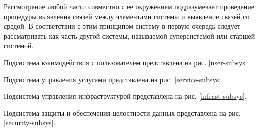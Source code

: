 Рассмотрение любой части совместно с ее окружением подразумевает проведение процедуры выявления связей между элементами системы и выявление связей со средой.
В соответствии с этим принципом систему в первую очередь следует рассматривать как часть другой системы, называемой суперсистемой или старшей системой.

Подсистема взаимодействия с пользователем представлена на рис. \ref{user-subsys}.

Подсистема управления услугами представлена на рис. \ref{service-subsys}.

Подсистема управления инфраструктурой представлена на рис. \ref{infrast-subsys}.

Подсистема защиты и обеспечения целостности данных представлена на рис. \ref{security-subsys}.

\clearpage
